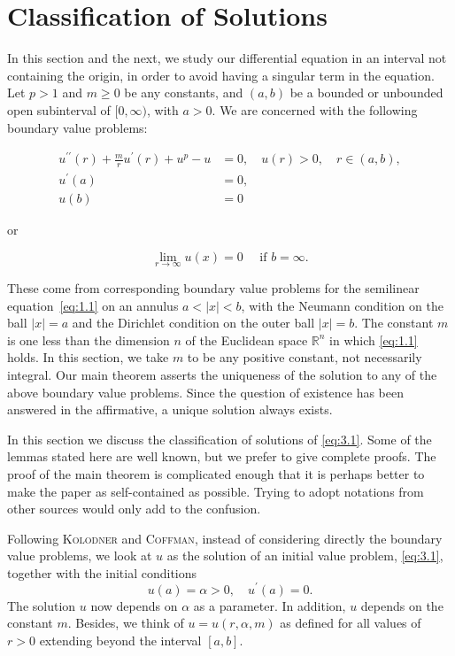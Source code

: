 \section{Classification of Solutions}\label{sec:3}

In this section and the next, we study our differential equation in an interval 
not containing the origin, in order to avoid having a singular term in the equation.
Let $p>1$ and $m \geq 0$ be any constants, and $(a, b)$ be a bounded or unbounded 
open subinterval of $[0, \infty)$, with $a>0$. We are concerned with the following
boundary value problems:

\begin{align}
  u^{\prime \prime}(r)+\frac{m}{r} u^{\prime}(r)+u^p-u & =0, \quad u(r)>0,
    \quad r \in(a, b), \label{eq:3.1} \\
  u^{\prime}(a) & = 0, \label{eq:3.2} \\
  u(b) & = 0 \label{eq:3.3}
\end{align}

or

\begin{equation}\label{eq:3.4}
  \lim _{r \rightarrow \infty} u(x)=0 \quad \text { if } b=\infty .
\end{equation}

These come from corresponding boundary value problems for the semilinear 
equation~\eqref{eq:1.1} on an annulus $a<|x|<b$, with the Neumann condition
on the ball $|x|=a$ and the Dirichlet condition on the outer ball $|x|=b$.
The constant $m$ is one less than the dimension $n$ of the Euclidean space 
$\mathbb{R}^n$ in which \eqref{eq:1.1} holds.
In this section, we take $m$ to be any positive constant, not necessarily integral.
Our main theorem asserts the uniqueness of the solution to any of the above boundary
value problems. Since the question of existence has been answered in the affirmative,
a unique solution always exists.

In this section we discuss the classification of solutions of \eqref{eq:3.1}. 
Some of the lemmas stated here are well known, but we prefer to give complete proofs.
The proof of the main theorem is complicated enough that it is perhaps better to make
the paper as self-contained as possible. Trying to adopt notations from other sources
would only add to the confusion.

Following \textsc{Kolodner} and \textsc{Coffman}, instead of considering directly the
boundary value problems, we look at $u$ as the solution of an initial value problem, 
\eqref{eq:3.1}, together with the initial conditions
\begin{equation}\label{eq:3.5}
  u(a)=\alpha>0, \quad u^{\prime}(a)=0.
\end{equation}
The solution $u$ now depends on $\alpha$ as a parameter.
In addition, $u$ depends on the constant $m$. Besides, 
we think of $u=u(r, \alpha, m)$ as defined for all values of $r>0$ 
extending beyond the interval $[a, b]$.

